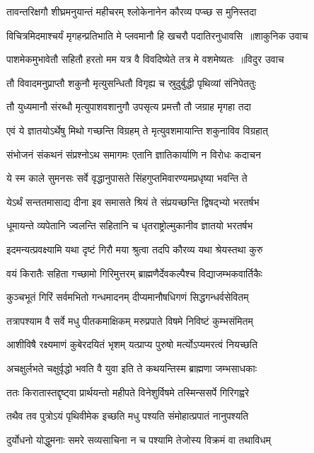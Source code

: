 \twolineshloka
{तावन्तरिक्षगौ शीघ्रमनुयान्तं महीचरम्}
{श्लोकेनानेन कौरव्य पप्च्छ स मुनिस्तदा}


\threelineshloka
{विचित्रमिदमाश्चर्यं मृगहन्प्रतिभाति मे}
{प्लवमानौ हि खचरौ पदातिरनुधावसि ॥शाकुनिक उवाच}
{}


\threelineshloka
{पाशमेकमुभावेतौ सहितौ हरतो मम}
{यत्र वै विवदिष्येते तत्र मे वशमेष्यतः ॥विदुर उवाच}
{}


\twolineshloka
{तौ विवादमनुप्राप्तौ शकुनौ मृत्युसन्धितौ}
{विगृह्य च स्रुदुर्बुद्धी पृथिव्यां संनिपेततुः}


\twolineshloka
{तौ युध्यमानौ संरब्धौ मृत्युपाशवशानुगौ}
{उपसृत्य प्रमत्तौ तौ जग्राह मृगहा तदा}


\twolineshloka
{एवं ये ज्ञातयोऽर्थेषु मिथो गच्छन्ति विग्रहम्}
{ते मृत्युवशमायान्ति शकुनाविव विग्रहात्}


\twolineshloka
{संभोजनं संकथनं संप्रश्नोऽथ समागमः}
{एतानि ज्ञातिकार्याणि न विरोधः कदाचन}


\twolineshloka
{ये स्म काले सुमनसः सर्वे वृद्धानुपासते}
{सिंहगुप्तमिवारण्यमप्रधृष्या भवन्ति ते}


\twolineshloka
{येऽर्थं सन्ततमासाद्य दीना इव समासते}
{श्रियं ते संप्रयच्छन्ति द्विषद्भ्यो भरतर्षभ}


\twolineshloka
{धूमायन्ते व्यपेतानि ज्वलन्ति सहितानि च}
{धृतराष्ट्रोल्मुकानीव ज्ञातयो भरतर्षभ}


\twolineshloka
{इदमन्यत्प्रवक्ष्यामि यथा दृष्टं गिरौ मया}
{श्रुत्वा तदपि कौरव्य यथा श्रेयस्तथा कुरु}


\twolineshloka
{वयं किरातैः सहिता गच्छामो गिरिमुत्तरम्}
{ब्राह्मणैर्देवकल्पैश्च विद्याजम्भकवार्तिकैः}


\twolineshloka
{कुञ्चभूतं गिरिं सर्वमभितो गन्धमादनम्}
{दीप्यमानौषधिगणं सिद्धगन्धर्वसेवितम्}


\twolineshloka
{तत्रापश्याम वै सर्वे मधु पीतकमाक्षिकम्}
{मरुप्रपाते विषमे निविष्टं कुम्भसंमितम्}


\twolineshloka
{आशीविषै रक्ष्यमाणं कुबेरदयितं भृशम्}
{यत्प्राप्य पुरुषो मर्त्योऽप्यमरत्वं नियच्छति}


\twolineshloka
{अचक्षुर्लभते चक्षुर्वृद्धो भवति वै युवा}
{इति ते कथयन्तिस्म ब्राह्मणा जम्भसाधकाः}


\twolineshloka
{ततः किरातास्तद्दृष्ट्वा प्रार्थयन्तो महीपते}
{विनेशुर्विषमे तस्मिन्ससर्पे गिरिगह्वरे}


\twolineshloka
{तथैव तव पुत्रोऽयं पृथिवीमेक इच्छति}
{मधु पश्यति संमोहात्प्रपातं नानुपश्यति}


\twolineshloka
{दुर्योधनो योद्धुमनाः समरे सव्यसाचिना}
{न च पश्यामि तेजोस्य विक्रमं वा तथाविधम्}


